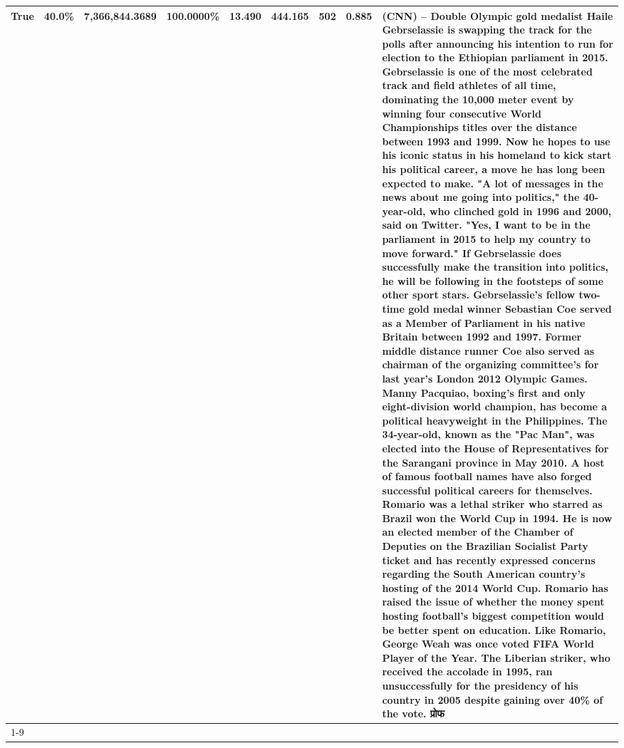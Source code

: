 \begin{table}[H]
{\begin{tabular}{lllrlllll}
True & 40.0\% & 7,366,844.3689 & \bfseries \color{red} 100.0000\% & 13.490 & 444.165 & 502 & 0.885 & (CNN) -- Double Olympic gold medalist Haile Gebrselassie is swapping the track for the polls after announcing his intention to run for election to the Ethiopian parliament in 2015. Gebrselassie is one of the most celebrated track and field athletes of all time, dominating the 10,000 meter event by winning four consecutive World Championships titles over the distance between 1993 and 1999. Now he hopes to use his iconic status in his homeland to kick start his political career, a move he has long been expected to make. "A lot of messages in the news about me going into politics," the 40-year-old, who clinched gold in 1996 and 2000, said on Twitter. "Yes, I want to be in the parliament in 2015 to help my country to move forward." If Gebrselassie does successfully make the transition into politics, he will be following in the footsteps of some other sport stars. Gebrselassie's fellow two-time gold medal winner Sebastian Coe served as a Member of Parliament in his native Britain between 1992 and 1997. Former middle distance runner Coe also served as chairman of the organizing committee's for last year's London 2012 Olympic Games. Manny Pacquiao, boxing's first and only eight-division world champion, has become a political heavyweight in the Philippines. The 34-year-old, known as the "Pac Man", was elected into the House of Representatives for the Sarangani province in May 2010. A host of famous football names have also forged successful political careers for themselves. Romario was a lethal striker who starred as Brazil won the World Cup in 1994. He is now an elected member of the Chamber of Deputies on the Brazilian Socialist Party ticket and has recently expressed concerns regarding the South American country's hosting of the 2014 World Cup. Romario has raised the issue of whether the money spent hosting football's biggest competition would be better spent on education. Like Romario, George Weah was once voted FIFA World Player of the Year. The Liberian striker, who received the accolade in 1995, ran unsuccessfully for the presidency of his country in 2005 despite gaining over 40\% of the vote. प्रोफ \\
\cline{1-9}

\end{tabular}}
\end{table}
